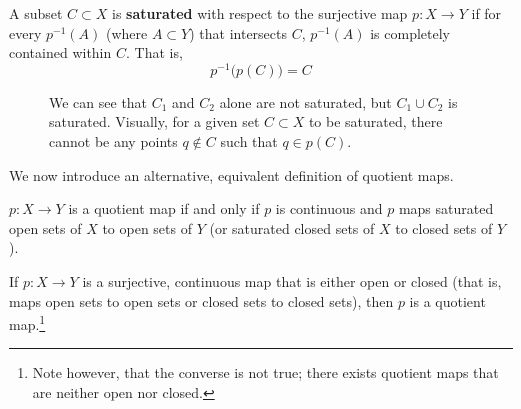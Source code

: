     \begin{definition}[Saturation]
      A subset $C \subset X$ is \textbf{saturated} with respect to the surjective map $p: X \rightarrow Y$ if for every $p^{-1} (A)$ (where $A \subset Y$) that intersects $C$, $p^{-1}(A)$ is completely contained within $C$. That is, 
      \begin{equation}
        p^{-1} \big( p(C) \big) = C
      \end{equation}

      \begin{figure}[H]
        \centering 
        \caption{We can see that $C_1$ and $C_2$ alone are not saturated, but $C_1 \cup C_2$ is saturated. Visually, for a given set $C \subset X$ to be saturated, there cannot be any points $q \not\in C$ such that $q \in p(C)$. }
        \label{fig:saturation}
      \end{figure}
    \end{definition}

    We now introduce an alternative, equivalent definition of quotient maps. 

    \begin{theorem}
      $p: X \rightarrow Y$ is a quotient map if and only if $p$ is continuous and $p$ maps saturated open sets of $X$ to open sets of $Y$ (or saturated closed sets of $X$ to closed sets of $Y$). 
    \end{theorem}

    \begin{proposition}
      If $p: X \rightarrow Y$ is a surjective, continuous map that is either open or closed (that is, maps open sets to open sets or closed sets to closed sets), then $p$ is a quotient map.\footnote{Note however, that the converse is not true; there exists quotient maps that are neither open nor closed. }
    \end{proposition}

